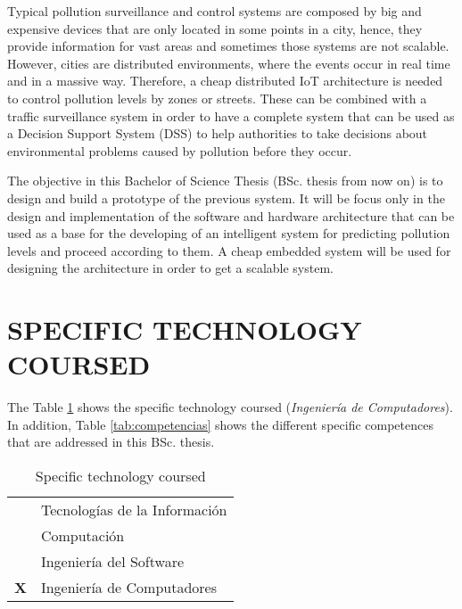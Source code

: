 \documentclass{pre-tfg}
\begin{document}
Typical pollution surveillance and control systems are composed by big and expensive devices that are only located in some points in a city, hence, they provide information for vast areas and sometimes those systems are not scalable. However, cities are distributed environments, where the events occur in real time and in a massive way. Therefore, a cheap distributed IoT architecture is needed to control pollution levels by zones or streets. These can be combined with a traffic surveillance system in order to have a complete system that can be used as a Decision Support System (DSS) to help authorities to take decisions about environmental problems caused by pollution before they occur.

The objective in this Bachelor of Science Thesis (BSc. thesis from now on) is to design and build a prototype of the previous system. It will be focus only in the design and implementation of the software and hardware architecture that can be used as a base for the developing of an intelligent system for predicting pollution levels and proceed according to them. A cheap embedded system will be used for designing the architecture in order to get a scalable system.



\section{SPECIFIC TECHNOLOGY COURSED}

The Table \ref{tab:tec-especifica} shows the specific technology coursed (\emph{Ingeniería de Computadores}). In addition, Table \ref{tab:competencias} shows the different specific competences that are addressed in this BSc. thesis. 

\begin{table}[hp]
	\centering
	\caption{Specific technology coursed}
	\label{tab:tec-especifica}
	
	\begin{tabular}{cp{}}
		\hline
		&Tecnologías de la Información \\
		&Computación \\
		&Ingeniería del Software \\
		\textbf{X}&Ingeniería de Computadores \\
		\hline
	\end{tabular}
\end{table}
\end{document}
